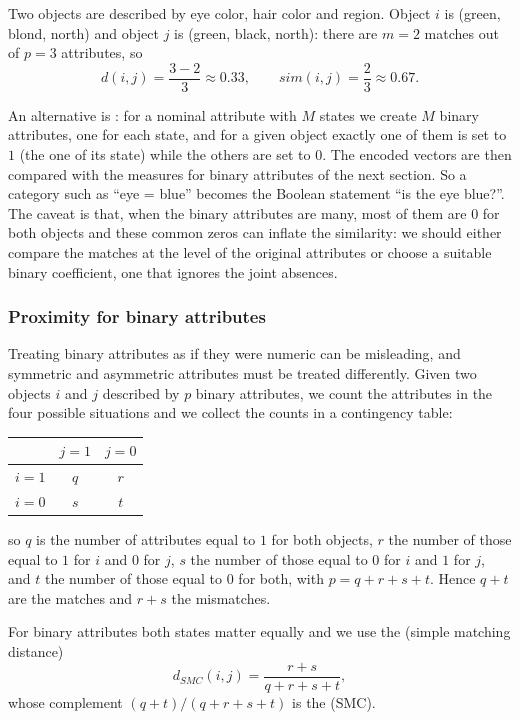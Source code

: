 \begin{example}
Two objects are described by eye color, hair color and region. Object $i$ is (green, blond, north) and object $j$ is (green, black, north): there are $m=2$ matches out of $p=3$ attributes, so
\[
    d(i,j)=\frac{3-2}{3}\approx 0.33,\qquad sim(i,j)=\frac{2}{3}\approx 0.67.
\]
\end{example}

An alternative is : for a nominal attribute with $M$ states we create $M$ binary attributes, one for each state, and for a given object exactly one of them is set to $1$ (the one of its state) while the others are set to $0$. The encoded vectors are then compared with the measures for binary attributes of the next section. So a category such as ``eye = blue'' becomes the Boolean statement ``is the eye blue?''. The caveat is that, when the binary attributes are many, most of them are $0$ for both objects and these common zeros can inflate the similarity: we should either compare the matches at the level of the original attributes or choose a suitable binary coefficient, one that ignores the joint absences.

\subsubsection{Proximity for binary attributes}
Treating binary attributes as if they were numeric can be misleading, and symmetric and asymmetric attributes must be treated differently. Given two objects $i$ and $j$ described by $p$ binary attributes, we count the attributes in the four possible situations and we collect the counts in a contingency table:
\begin{center}
\begin{tabular}{c|cc}
    \toprule
              & $j=1$ & $j=0$ \\
    \midrule
    $i=1$     & $q$   & $r$   \\
    $i=0$     & $s$   & $t$   \\
    \bottomrule
\end{tabular}
\end{center}
so $q$ is the number of attributes equal to $1$ for both objects, $r$ the number of those equal to $1$ for $i$ and $0$ for $j$, $s$ the number of those equal to $0$ for $i$ and $1$ for $j$, and $t$ the number of those equal to $0$ for both, with $p=q+r+s+t$. Hence $q+t$ are the matches and $r+s$ the mismatches.

For  binary attributes both states matter equally and we use the  (simple matching distance)
\[
    d_{SMC}(i,j)=\frac{r+s}{q+r+s+t},
\]
whose complement $(q+t)/(q+r+s+t)$ is the  (SMC).

